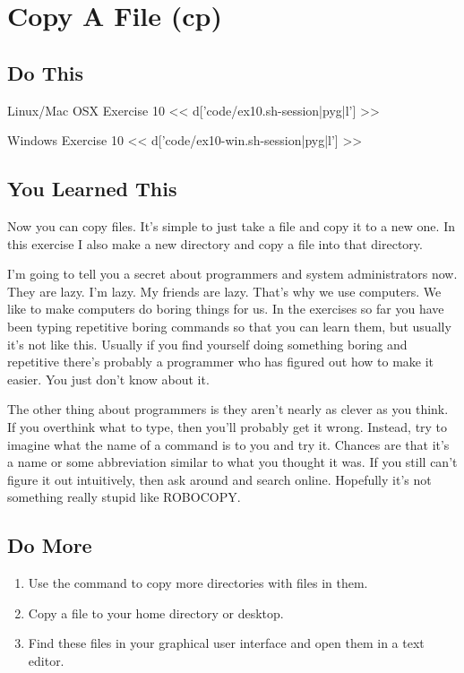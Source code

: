 \chapter{Copy A File (cp)}

\section{Do This}

\begin{code}{Linux/Mac OSX Exercise 10}
<< d['code/ex10.sh-session|pyg|l'] >>
\end{code}

\begin{code}{Windows Exercise 10}
<< d['code/ex10-win.sh-session|pyg|l'] >>
\end{code}

\section{You Learned This}

Now you can copy files.  It's simple to just take a file and copy it to a new
one.  In this exercise I also make a new directory and copy a file into that
directory.

I'm going to tell you a secret about programmers and system administrators now.
They are lazy.  I'm lazy.  My friends are lazy.  That's why we use computers.
We like to make computers do boring things for us.  In the exercises so far
you have been typing repetitive boring commands so that you can learn them,
but usually it's not like this.  Usually if you find yourself doing something
boring and repetitive there's probably a programmer who has figured out
how to make it easier. You just don't know about it.

The other thing about programmers is they aren't nearly as clever as you think.
If you overthink what to type, then you'll probably get it wrong.  Instead, try
to imagine what the name of a command is to you and try it.  Chances are that
it's a name or some abbreviation similar to what you thought it was.  If you still can't figure it out intuitively,
then ask around and search online. Hopefully it's not something really stupid like ROBOCOPY.


\section{Do More}

\begin{enumerate}
\item Use the  command to copy more directories with files in them.
\item Copy a file to your home directory or desktop.
\item Find these files in your graphical user interface and open them
    in a text editor.
\end{enumerate}

